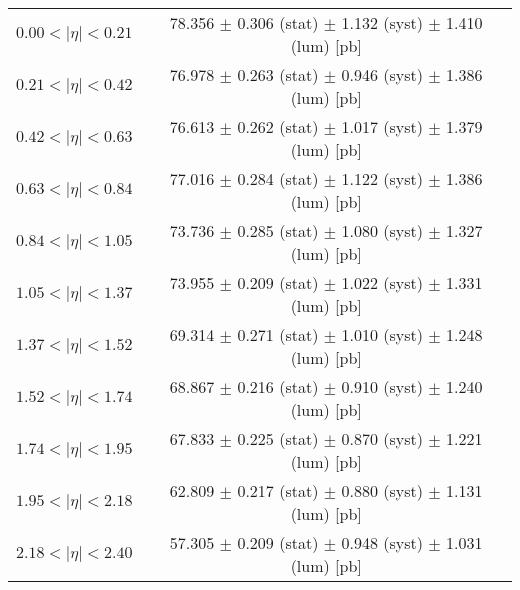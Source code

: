 \begin{tabular}{lc}
\hline
$0.00 < |\eta| <0.21$          & 78.356 $\pm$ 0.306 (stat) $\pm$ 1.132 (syst) $\pm$ 1.410 (lum) [pb]  \\
$0.21 < |\eta| <0.42$          & 76.978 $\pm$ 0.263 (stat) $\pm$ 0.946 (syst) $\pm$ 1.386 (lum) [pb]  \\
$0.42 < |\eta| <0.63$          & 76.613 $\pm$ 0.262 (stat) $\pm$ 1.017 (syst) $\pm$ 1.379 (lum) [pb]  \\
$0.63 < |\eta| <0.84$          & 77.016 $\pm$ 0.284 (stat) $\pm$ 1.122 (syst) $\pm$ 1.386 (lum) [pb]  \\
$0.84 < |\eta| <1.05$          & 73.736 $\pm$ 0.285 (stat) $\pm$ 1.080 (syst) $\pm$ 1.327 (lum) [pb]  \\
$1.05 < |\eta| <1.37$          & 73.955 $\pm$ 0.209 (stat) $\pm$ 1.022 (syst) $\pm$ 1.331 (lum) [pb]  \\
$1.37 < |\eta| <1.52$          & 69.314 $\pm$ 0.271 (stat) $\pm$ 1.010 (syst) $\pm$ 1.248 (lum) [pb]  \\
$1.52 < |\eta| <1.74$          & 68.867 $\pm$ 0.216 (stat) $\pm$ 0.910 (syst) $\pm$ 1.240 (lum) [pb]  \\
$1.74 < |\eta| <1.95$          & 67.833 $\pm$ 0.225 (stat) $\pm$ 0.870 (syst) $\pm$ 1.221 (lum) [pb]  \\
$1.95 < |\eta| <2.18$          & 62.809 $\pm$ 0.217 (stat) $\pm$ 0.880 (syst) $\pm$ 1.131 (lum) [pb]  \\
$2.18 < |\eta| <2.40$          & 57.305 $\pm$ 0.209 (stat) $\pm$ 0.948 (syst) $\pm$ 1.031 (lum) [pb]  \\
\hline
\end{tabular}
